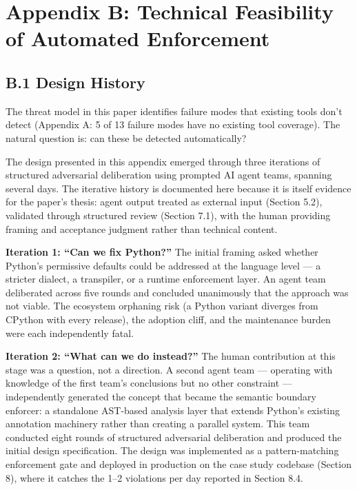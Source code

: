 \documentclass[a4paper,11pt]{report}
\begin{document}
\hypertarget{appendix-b-technical-feasibility-of-automated-enforcement}{%
\section{Appendix B: Technical Feasibility of Automated
Enforcement}\label{appendix-b-technical-feasibility-of-automated-enforcement}}

\hypertarget{b.1-design-history}{%
\subsection{B.1 Design History}\label{b.1-design-history}}

The threat model in this paper identifies failure modes that existing
tools don't detect (Appendix A: 5 of 13 failure modes have no existing
tool coverage). The natural question is: can these be detected
automatically?

The design presented in this appendix emerged through three iterations
of structured adversarial deliberation using prompted AI agent teams,
spanning several days. The iterative history is documented here because
it is itself evidence for the paper's thesis: agent output treated as
external input (Section 5.2), validated through structured review
(Section 7.1), with the human providing framing and acceptance judgment
rather than technical content.

\textbf{Iteration 1: ``Can we fix Python?''} The initial framing asked
whether Python's permissive defaults could be addressed at the language
level --- a stricter dialect, a transpiler, or a runtime enforcement
layer. An agent team deliberated across five rounds and concluded
unanimously that the approach was not viable. The ecosystem orphaning
risk (a Python variant diverges from CPython with every release), the
adoption cliff, and the maintenance burden were each independently
fatal.

\textbf{Iteration 2: ``What can we do instead?''} The human contribution
at this stage was a question, not a direction. A second agent team ---
operating with knowledge of the first team's conclusions but no other
constraint --- independently generated the concept that became the
semantic boundary enforcer: a standalone AST-based analysis layer that
extends Python's existing annotation machinery rather than creating a
parallel system. This team conducted eight rounds of structured
adversarial deliberation and produced the initial design specification.
The design was implemented as a pattern-matching enforcement gate and
deployed in production on the case study codebase (Section 8), where it
catches the 1--2 violations per day reported in Section 8.4.
\end{document}

